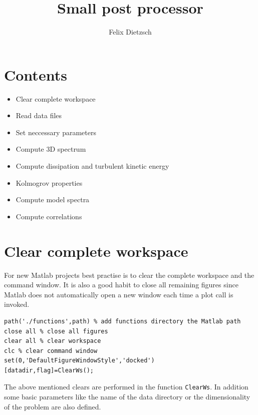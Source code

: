 \documentclass[preprint,12pt,ntfdMod]{elsarticle}
\author[rss]{Felix Dietzsch}
\title{Small post processor}
\begin{document}
\maketitle 
\tableofcontents

    
    
\section{Contents}

\begin{itemize}
\setlength{\itemsep}{-1ex}
   \item Clear complete workspace
   \item Read data files
   \item Set neccessary parameters
   \item Compute 3D spectrum
   \item Compute dissipation and turbulent kinetic energy
   \item Kolmogrov properties
   \item Compute model spectra
   \item Compute correlations
\end{itemize}


\section{Clear complete workspace}

\begin{par}
For new Matlab projects best practise is to clear the complete workspace and the command window. It is also a good habit to close all remaining figures since Matlab does not automatically open a new window each time a plot call is invoked.
\end{par} \vspace{1em}
\begin{lstlisting}
path('./functions',path) % add functions directory the Matlab path
close all % close all figures
clear all % clear workspace
clc % clear command window
set(0,'DefaultFigureWindowStyle','docked')
[datadir,flag]=ClearWs();
\end{lstlisting}
\begin{par}

The above mentioned clears are performed in the function \verb|ClearWs|.
In addition some basic parameters like the name of the data
directory or the dimensionality of the problem are also defined.


\end{par} \vspace{1em}
\end{document}

